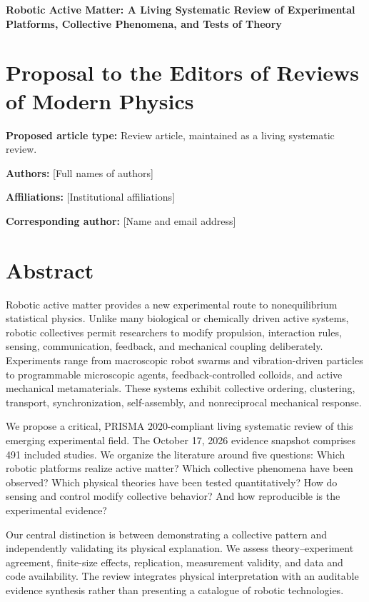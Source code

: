 \begin{center}
{\Large\bfseries Robotic Active Matter: A Living Systematic Review
of Experimental Platforms, Collective Phenomena, and Tests of Theory}
\end{center}

\section*{Proposal to the Editors of Reviews of Modern Physics}

\noindent\textbf{Proposed article type:}
Review article, maintained as a living systematic review.

\noindent\textbf{Authors:}
[Full names of authors]

\noindent\textbf{Affiliations:}
[Institutional affiliations]

\noindent\textbf{Corresponding author:}
[Name and email address]

\section*{Abstract}

Robotic active matter provides a new experimental route to
nonequilibrium statistical physics. Unlike many biological
or chemically driven active systems, robotic collectives
permit researchers to modify propulsion, interaction
rules, sensing, communication, feedback, and mechanical
coupling deliberately. Experiments range from macroscopic
robot swarms and vibration-driven particles to programmable
microscopic agents, feedback-controlled colloids, and
active mechanical metamaterials. These systems exhibit
collective ordering, clustering, transport, synchronization,
self-assembly, and nonreciprocal mechanical response.

We propose a critical, PRISMA 2020-compliant living
systematic review of this emerging experimental field.
The October 17, 2026 evidence snapshot comprises
491 included studies. We organize the literature around
five questions: Which robotic platforms realize active
matter? Which collective phenomena have been observed?
Which physical theories have been tested quantitatively?
How do sensing and control modify collective behavior?
And how reproducible is the experimental evidence?

Our central distinction is between demonstrating a
collective pattern and independently validating its
physical explanation. We assess theory--experiment
agreement, finite-size effects, replication, measurement
validity, and data and code availability. The review
integrates physical interpretation with an auditable
evidence synthesis rather than presenting a catalogue
of robotic technologies.

